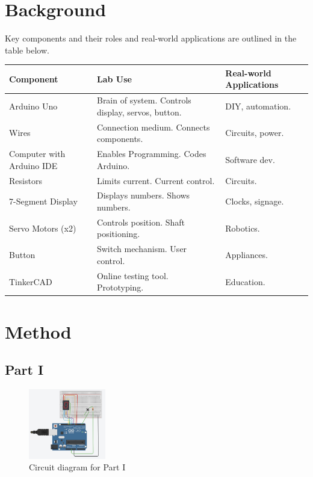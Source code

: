 \documentclass[journal]{IEEEtran}
\begin{document}
\section{Background}

Key components and their roles and real-world applications are outlined in the table below.

\begin{tabular}{|p{1.6cm}|p{3.5cm}|p{2.5cm}|}
\hline
\textbf{Component} & \textbf{Lab Use} & \textbf{Real-world Applications} \\
\hline
Arduino Uno\cite{ArduinoOfficialDocs} & Brain of system. Controls display, servos, button. & DIY, automation. \\
\hline
Wires & Connection medium. Connects components. & Circuits, power. \\
\hline
Computer with Arduino IDE\cite{ArduinoSoftware} & Enables Programming. Codes Arduino. & Software dev. \\
\hline
Resistors & Limits current. Current control. & Circuits. \\
\hline
7-Segment Display & Displays numbers. Shows numbers. & Clocks, signage. \\
\hline
Servo Motors (x2) & Controls position. Shaft positioning. & Robotics. \\
\hline
Button & Switch mechanism. User control. & Appliances. \\
\hline
TinkerCAD & Online testing tool. Prototyping. & Education. \\
\hline
\end{tabular}





\section{Method}
\subsection{Part I}

\begin{figure}[h]
\centering
\includegraphics[width=0.3\textwidth]{images/Part1_circuits.jpg}
\caption{Circuit diagram for Part I}
\label{fig:circuit_part1}
\end{figure}
\end{document}
